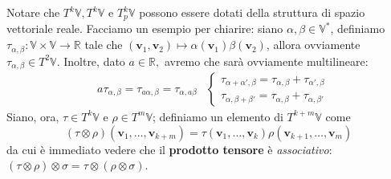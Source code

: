 Notare che $T^k\mathbb{V}, T^k\mathbb{V}$ e $T^k_p\mathbb{V}$ possono essere dotati della struttura di spazio vettoriale reale.
Facciamo un esempio per chiarire: siano $\alpha, \beta \in \mathbb{V}^*$, definiamo $\tau_{\alpha, \beta} : \mathbb{V} \times \mathbb{V} \longrightarrow \mathbb{R}$ tale che $(\mathbf{v}_1, \mathbf{v}_2) \mapsto \alpha(\mathbf{v}_1) \beta(\mathbf{v}_2)$, allora ovviamente $\tau_{\alpha, \beta} \in T^2\mathbb{V}$. Inoltre, dato $a \in \mathbb{R},$ avremo che sarà ovviamente multilineare:
\begin{align}
     & a \tau_{\alpha, \beta} = \tau_{a \alpha, \beta} = \tau_{\alpha, a \beta}
     & \begin{cases}
           \tau_{\alpha + \alpha', \beta} = \tau_{\alpha, \beta} + \tau_{\alpha', \beta} \\
           \tau_{\alpha, \beta + \beta'} = \tau_{\alpha, \beta} + \tau_{\alpha, \beta'}
       \end{cases}
\end{align}
Siano, ora, $\tau \in T^k\mathbb{V}$ e $\rho \in T^m\mathbb{V}$; definiamo un elemento di $T^{k+m}\mathbb{V}$ come
\[
    (\tau \otimes \rho)(\mathbf{v}_1, \dots, \mathbf{v}_{k+m}) = \tau(\mathbf{v}_1, \dots, \mathbf{v}_{k}) \rho(\mathbf{v}_{k+1}, \dots, \mathbf{v}_{m})
\]
da cui è immediato vedere che il \textbf{prodotto tensore} è \emph{associativo}: $(\tau \otimes \rho) \otimes \sigma = \tau \otimes (\rho \otimes \sigma)$.

